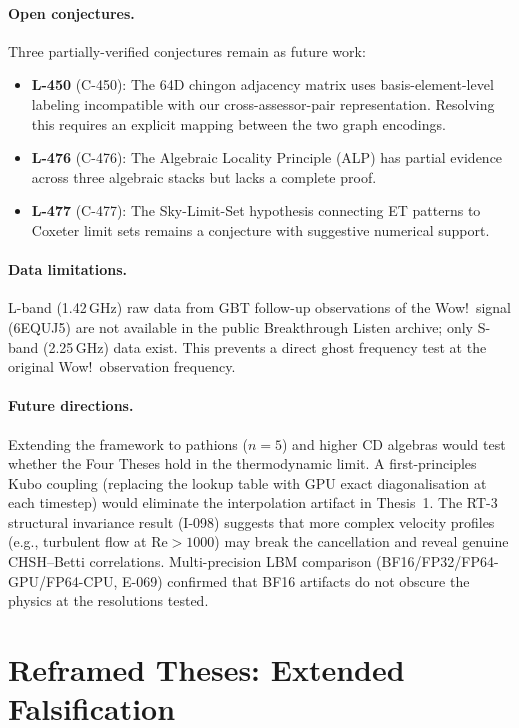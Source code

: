 \documentclass[12pt]{article}
\theoremstyle{definition}
\theoremstyle{plain}
\theoremstyle{remark}
\begin{document}
\paragraph{Open conjectures.}
Three partially-verified conjectures remain as future work:
\begin{itemize}
  \item \textbf{L-450} (C-450): The 64D chingon adjacency matrix
    uses basis-element-level labeling incompatible with our
    cross-assessor-pair representation.  Resolving this requires
    an explicit mapping between the two graph encodings.
  \item \textbf{L-476} (C-476): The Algebraic Locality Principle
    (ALP) has partial evidence across three algebraic stacks but
    lacks a complete proof.
  \item \textbf{L-477} (C-477): The Sky-Limit-Set hypothesis
    connecting ET patterns to Coxeter limit sets remains a
    conjecture with suggestive numerical support.
\end{itemize}

\paragraph{Data limitations.}
L-band (1.42\,GHz) raw data from GBT follow-up observations of the
Wow!\ signal (6EQUJ5) are not available in the public Breakthrough
Listen archive; only S-band (2.25\,GHz) data exist.  This prevents
a direct ghost frequency test at the original Wow!\ observation
frequency.

\paragraph{Future directions.}
Extending the framework to pathions ($n = 5$) and higher CD
algebras would test whether the Four Theses hold in the
thermodynamic limit.  A first-principles Kubo coupling (replacing
the lookup table with GPU exact diagonalisation at each timestep)
would eliminate the interpolation artifact in Thesis~1.  The RT-3
structural invariance result (I-098) suggests that more complex
velocity profiles (e.g., turbulent flow at $\mathrm{Re} > 1000$)
may break the cancellation and reveal genuine CHSH--Betti
correlations.  Multi-precision LBM comparison (BF16/FP32/FP64-GPU/FP64-CPU,
E-069) confirmed that BF16 artifacts do not obscure the physics at the
resolutions tested.

\section{Reframed Theses: Extended Falsification}
\label{sec:reframed}
\end{document}
